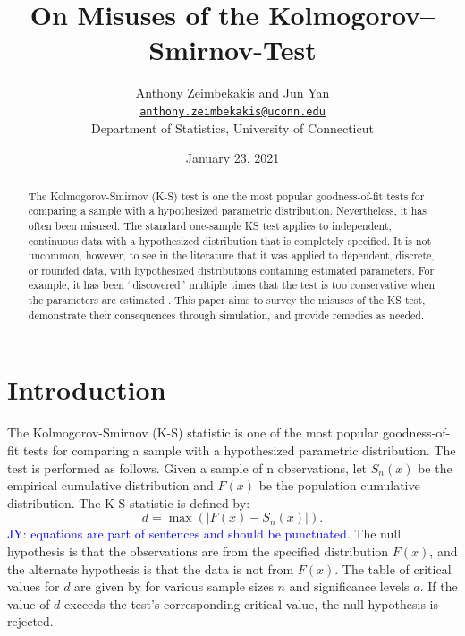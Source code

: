 \documentclass[12pt, letterpaper, titlepage]{article}
\title{On Misuses of the Kolmogorov–Smirnov-Test}
\author{Anthony Zeimbekakis and Jun Yan\\
\href{mailto:anthony.zeimbekakis@uconn.edu}{\nolinkurl{anthony.zeimbekakis@uconn.edu}}\\
Department of Statistics, University of Connecticut}
\date{January 23, 2021}
\newcommand{\jy}[1]{\textcolor{blue}{JY: #1}}
\begin{document}
\maketitle

\doublespace

\begin{abstract}
The Kolmogorov-Smirnov (K-S) test is one the most popular goodness-of-fit tests for 
comparing a sample with a hypothesized parametric distribution. Nevertheless, it has 
often been misused. The standard one-sample KS test applies to independent, continuous 
data with a hypothesized distribution that is completely specified. It is not uncommon, 
however, to see in the literature that it was applied to dependent, discrete, or 
rounded data, with hypothesized distributions containing estimated parameters. 
For example, it has been “discovered” multiple times that the test is too conservative 
when the parameters are estimated \citep[e.g.,][]{Steinskog}. This paper aims to survey 
the misuses of the KS test, demonstrate their consequences through simulation, and 
provide remedies as needed.
\end{abstract}


\hypertarget{sec:intro}{%
\section{Introduction}\label{sec:intro}}

The Kolmogorov-Smirnov (K-S) statistic is one of the most popular goodness-of-fit 
tests for comparing a sample with a hypothesized parametric distribution. The test is 
performed as follows. Given a sample of n observations, let $S_{n}(x)$ be the empirical 
cumulative distribution and $F(x)$ be the population cumulative distribution. The K-S 
statistic is defined by:
\[
  d = \max(\lvert F(x)-S_{n}(x) \rvert).
\]
\jy{equations are part of sentences and should be punctuated.}
The null hypothesis 
is that the observations are from the specified distribution $F(x)$, and the 
alternate hypothesis is that the data is not from $F(x)$. The table of critical 
values for $d$ are given by \citet{Massey} for various sample sizes $n$ and significance 
levels $a$. If the value of $d$ exceeds the test's corresponding critical value, 
the null hypothesis is rejected.
\end{document}
